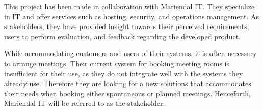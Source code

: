 This project has been made in collaboration with Mariendal IT.
They specialize in IT and offer services such as hosting, security, and operations management\cite{Mariendal_OmOs}.
As stakeholders, they have provided insight towards their perceived requirements, users to perform evaluation, and feedback regarding the developed product.

While accommodating customers and users of their systems, it is often necessary to arrange meetings.
Their current system for booking meeting rooms is insufficient for their use, as they do not integrate well with the systems they already use.
Therefore they are looking for a new solutions that accommodates their needs when booking either spontaneous or planned meetings. 
Henceforth, Mariendal IT will be referred to as the stakeholder. 